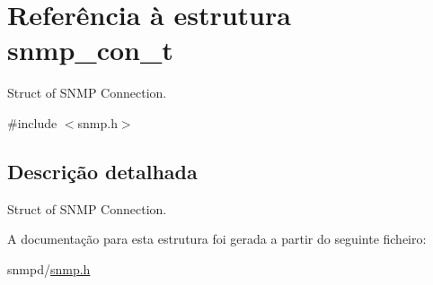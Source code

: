 \hypertarget{structsnmp__con__t}{\section{Referência à estrutura snmp\+\_\+con\+\_\+t}
\label{structsnmp__con__t}
}


Struct of S\+N\+M\+P Connection.  




{\ttfamily \#include $<$snmp.\+h$>$}



\subsection{Descrição detalhada}
Struct of S\+N\+M\+P Connection. 

A documentação para esta estrutura foi gerada a partir do seguinte ficheiro\+:\begin{DoxyCompactItemize}
\item 
snmpd/\hyperlink{snmp_8h}{snmp.\+h}\end{DoxyCompactItemize}
